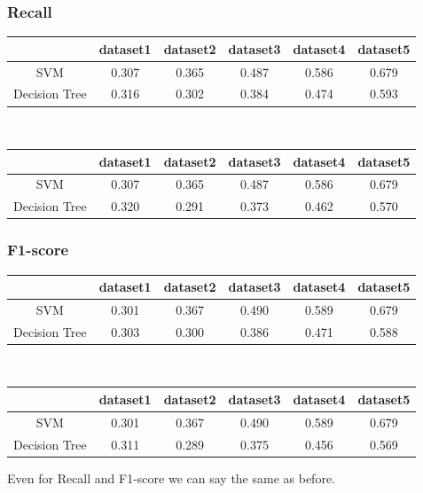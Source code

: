 \documentclass{article}
\begin{document}
\subsubsection*{Recall}
\begin{table}[H]
\begin{tabular}{|c|c|c|c|c|c|}
\hline
 & dataset1 & dataset2 & dataset3 & dataset4 & dataset5 \\ \hline
SVM & 0.307 & 0.365 & 0.487 & 0.586 & 0.679 \\ \hline
Decision Tree & 0.316 & 0.302 & 0.384 & 0.474 & 0.593 \\ \hline
\end{tabular}\\
\begin{tabular}{|c|c|c|c|c|c|}
\hline
 & dataset1 & dataset2 & dataset3 & dataset4 & dataset5 \\ \hline
SVM & 0.307 & 0.365 & 0.487 & 0.586 & 0.679 \\ \hline
Decision Tree & 0.320 & 0.291 & 0.373 & 0.462 & 0.570 \\ \hline
\end{tabular}
\end{table}
\subsubsection*{F1-score}
\begin{table}[h]
\begin{tabular}{|c|c|c|c|c|c|}
\hline
 & dataset1 & dataset2 & dataset3 & dataset4 & dataset5 \\ \hline
SVM & 0.301 & 0.367 & 0.490 & 0.589 & 0.679 \\ \hline
Decision Tree & 0.303 & 0.300 & 0.386 & 0.471 & 0.588 \\ \hline
\end{tabular}\\
\begin{tabular}{|c|c|c|c|c|c|}
\hline
 & dataset1 & dataset2 & dataset3 & dataset4 & dataset5 \\ \hline
SVM & 0.301 & 0.367 & 0.490 & 0.589 & 0.679 \\ \hline
Decision Tree & 0.311 & 0.289 & 0.375 & 0.456 & 0.569 \\ \hline
\end{tabular}
\end{table}
Even for Recall and F1-score we can say the same as before.
\end{document}
